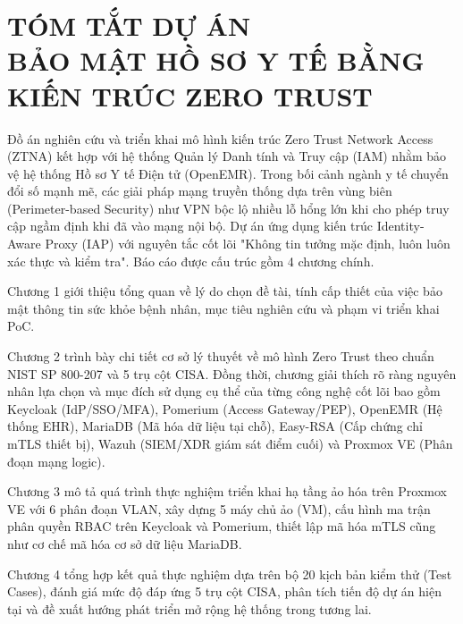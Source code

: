 \section*{TÓM TẮT DỰ ÁN\\BẢO MẬT HỒ SƠ Y TẾ BẰNG KIẾN TRÚC ZERO TRUST}

Đồ án nghiên cứu và triển khai mô hình kiến trúc Zero Trust Network Access (ZTNA) kết hợp với hệ thống Quản lý Danh tính và Truy cập (IAM) nhằm bảo vệ hệ thống Hồ sơ Y tế Điện tử (OpenEMR). Trong bối cảnh ngành y tế chuyển đổi số mạnh mẽ, các giải pháp mạng truyền thống dựa trên vùng biên (Perimeter-based Security) như VPN bộc lộ nhiều lỗ hổng lớn khi cho phép truy cập ngầm định khi đã vào mạng nội bộ. Dự án ứng dụng kiến trúc Identity-Aware Proxy (IAP) với nguyên tắc cốt lõi "Không tin tưởng mặc định, luôn luôn xác thực và kiểm tra". Báo cáo được cấu trúc gồm 4 chương chính.

Chương 1 giới thiệu tổng quan về lý do chọn đề tài, tính cấp thiết của việc bảo mật thông tin sức khỏe bệnh nhân, mục tiêu nghiên cứu và phạm vi triển khai PoC.

Chương 2 trình bày chi tiết cơ sở lý thuyết về mô hình Zero Trust theo chuẩn NIST SP 800-207 và 5 trụ cột CISA. Đồng thời, chương giải thích rõ ràng nguyên nhân lựa chọn và mục đích sử dụng cụ thể của từng công nghệ cốt lõi bao gồm Keycloak (IdP/SSO/MFA), Pomerium (Access Gateway/PEP), OpenEMR (Hệ thống EHR), MariaDB (Mã hóa dữ liệu tại chỗ), Easy-RSA (Cấp chứng chỉ mTLS thiết bị), Wazuh (SIEM/XDR giám sát điểm cuối) và Proxmox VE (Phân đoạn mạng logic).

Chương 3 mô tả quá trình thực nghiệm triển khai hạ tầng ảo hóa trên Proxmox VE với 6 phân đoạn VLAN, xây dựng 5 máy chủ ảo (VM), cấu hình ma trận phân quyền RBAC trên Keycloak và Pomerium, thiết lập mã hóa mTLS cũng như cơ chế mã hóa cơ sở dữ liệu MariaDB.

Chương 4 tổng hợp kết quả thực nghiệm dựa trên bộ 20 kịch bản kiểm thử (Test Cases), đánh giá mức độ đáp ứng 5 trụ cột CISA, phân tích tiến độ dự án hiện tại và đề xuất hướng phát triển mở rộng hệ thống trong tương lai.

\newpage
